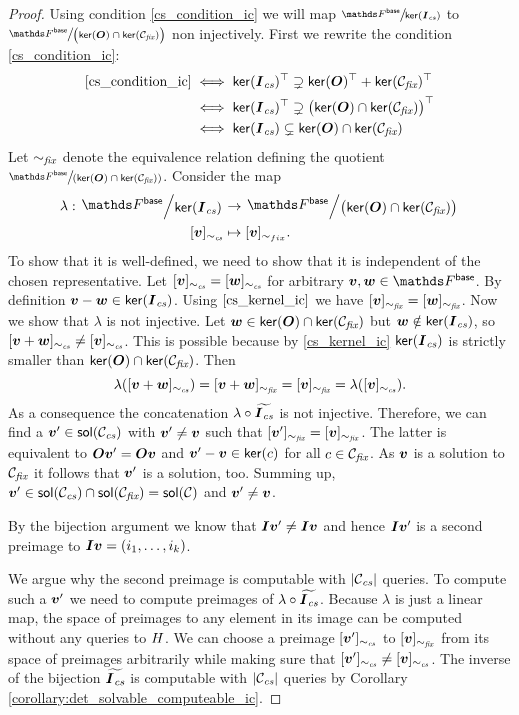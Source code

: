 \begin{proof}
    Using condition \eqref{cs_condition_ic} we will map
    $\sfrac{\Fsp}{\ker(\Ics)}$ to $\sfrac{\Fsp}{\big(\ker(\O) \cap \ker(\Cfix)\big)}$
    non injectively.
    First we rewrite the condition \eqref{cs_condition_ic}:
    \begin{align}
    \eqref{cs_condition_ic} &\iff \mathsf{ker}(\boldsymbol{I}_\textit{cs})^\top \supsetneq \mathsf{ker}(\boldsymbol{O})^\top + \mathsf{ker}(\mathcal{C}_\textit{fix})^\top \\
    &\iff \mathsf{ker}(\boldsymbol{I}_\textit{cs})^\top \supsetneq \big(\mathsf{ker}(\boldsymbol{O}) \cap \mathsf{ker}(\mathcal{C}_\textit{fix})\big)^\top \\
    \label{cs_kernel_ic}
    &\iff \mathsf{ker}(\boldsymbol{I}_\textit{cs}) \subsetneq \mathsf{ker}(\boldsymbol{O}) \cap \mathsf{ker}(\mathcal{C}_\textit{fix})
    \end{align}
    Let ${\sim_\textit{fix}}$ denote the equivalence relation defining the quotient $\sfrac{\Fsp}{(\ker(\O) \cap \ker(\Cfix))}$.
    Consider the map
    \begin{align*}
        \lambda: \bigslant{\Fsp}{\ker(\Ics)} &\to \bigslant{\Fsp}{\big(\ker(\O) \cap \ker(\Cfix)\big)} \\
        [\vv]_{\simcs} &\mapsto [\vv]_{\sim_{fix}}.
    \end{align*}
    To show that it is well-defined,
    we need to show that it is independent of the chosen representative.
    Let $[\boldsymbol v]_{\sim_\textit{cs}} = [\boldsymbol w]_{\sim_\textit{cs}}$ for arbitrary $\vv,\vw \in \Fsp$.
    By definition $\boldsymbol v-\boldsymbol w \in \mathsf{ker}(\boldsymbol{I}_\textit{cs})$.
    Using $\eqref{cs_kernel_ic}$ we have $[\boldsymbol v]_{\sim_\textit{fix}} = [\boldsymbol w]_{\sim_\textit{fix}}$.
    Now we show that $\lambda$ is not injective.
    Let $\boldsymbol w \in \mathsf{ker}(\boldsymbol{O}) \cap \mathsf{ker}(\mathcal{C}_\textit{fix})$ but $\boldsymbol w \notin \mathsf{ker}(\boldsymbol{I}_\textit{cs})$,
    so $[\boldsymbol v + \boldsymbol w]_{\sim_\textit{cs}} \neq [\boldsymbol v]_{\sim_\textit{cs}}$.
    This is possible because by \eqref{cs_kernel_ic} $\mathsf{ker}(\boldsymbol{I}_\textit{cs})$ is strictly smaller than $\mathsf{ker}(\boldsymbol{O}) \cap \mathsf{ker}(\mathcal{C}_\textit{fix})$.
    Then
    \[
        \lambda([\boldsymbol v + \boldsymbol w]_{\sim_\textit{cs}}) = [\boldsymbol v + \boldsymbol w]_{\sim_\textit{fix}} = [\boldsymbol v]_{\sim_\textit{fix}} = \lambda([\boldsymbol v]_{\sim_\textit{cs}}).
    \]
    As a consequence the concatenation $\lambda \circ \widetilde{\boldsymbol{I}_\textit{cs}}$ is not injective.
    Therefore, we can find a $\boldsymbol v' \in \mathsf{sol}(\mathcal{C}_\textit{cs})$ with $\boldsymbol v' \neq \boldsymbol v$ such that $[\boldsymbol v']_{\sim_\textit{fix}} = [\boldsymbol v]_{\sim_\textit{fix}}$.
    The latter is equivalent to $\boldsymbol{O}\boldsymbol v' = \boldsymbol{O}\boldsymbol v$ and $\boldsymbol v' - \boldsymbol v \in \mathsf{ker}(c)$ for all $c \in \mathcal{C}_\textit{fix}$.
    As $\boldsymbol v$ is a solution to $\mathcal{C}_\textit{fix}$ it follows that $\boldsymbol v'$ is a solution, too.
    Summing up, $\boldsymbol v' \in \mathsf{sol}(\mathcal{C}_\textit{cs}) \cap \mathsf{sol}(\mathcal{C}_\textit{fix}) = \mathsf{sol}(\mathcal{C})$ and $\boldsymbol v' \neq \boldsymbol v$.
    
    By the bijection argument we know that $\boldsymbol{I}\boldsymbol v' \neq \boldsymbol{I}\boldsymbol v$ and hence
    $\boldsymbol{I}\boldsymbol v'$ is a second preimage to $\boldsymbol{I}\boldsymbol v = (i_1, \dots, i_{k})$.
    
    We argue why the second preimage is computable with $|\mathcal{C}_\textit{cs}|$ queries.
    To compute such a $\boldsymbol v'$ we need to compute preimages of $\lambda \circ \widetilde{\boldsymbol{I}_\textit{cs}}$.
    Because $\lambda$ is just a linear map, the space of preimages to any element in its image can be computed without any queries to $H$.
    We can choose a preimage $[\boldsymbol v']_{\sim_\textit{cs}}$ to $[\boldsymbol v]_{\sim_\textit{fix}}$ from its space of preimages arbitrarily while making sure that $[\boldsymbol v']_{\sim_\textit{cs}} \neq [\boldsymbol v]_{\sim_\textit{cs}}$.
    The inverse of the bijection $\widetilde{\boldsymbol{I}_\textit{cs}}$ is computable with $|\mathcal{C}_\textit{cs}|$ queries by Corollary \ref{corollary:det_solvable_computeable_ic}.
\end{proof}

